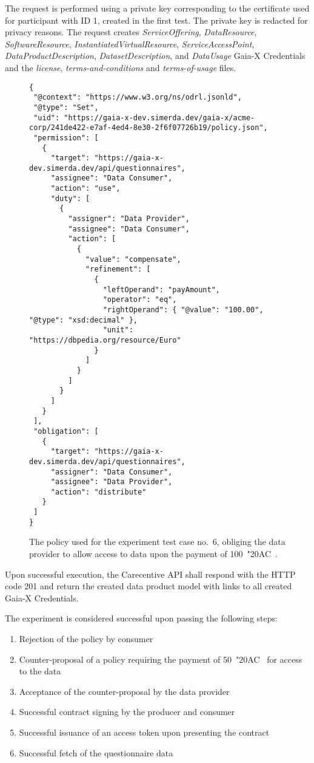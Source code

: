The request is performed using a private key corresponding to the certificate used for participant with ID 1, created in the first test.
The private key is redacted for privacy reasons.
The request creates \textit{ServiceOffering}, \textit{DataResource}, \textit{SoftwareResource}, \textit{InstantiatedVirtualResource}, \textit{ServiceAccessPoint}, \textit{DataProductDescription}, \textit{DatasetDescription}, and \textit{DataUsage} Gaia-X Credentials and the \textit{license}, \textit{terms-and-conditions} and \textit{terms-of-usage} files.

\begin{figure}[h]
    \centering
    \begin{verbatim}
{
 "@context": "https://www.w3.org/ns/odrl.jsonld",
 "@type": "Set",
 "uid": "https://gaia-x-dev.simerda.dev/gaia-x/acme-corp/241de422-e7af-4ed4-8e30-2f6f07726b19/policy.json",
 "permission": [
   {
     "target": "https://gaia-x-dev.simerda.dev/api/questionnaires",
     "assignee": "Data Consumer",
     "action": "use",
     "duty": [
       {
         "assigner": "Data Provider",
         "assignee": "Data Consumer",
         "action": [
           {
             "value": "compensate",
             "refinement": [
               {
                 "leftOperand": "payAmount",
                 "operator": "eq",
                 "rightOperand": { "@value": "100.00", "@type": "xsd:decimal" },
                 "unit": "https://dbpedia.org/resource/Euro"
               }
             ]
           }
         ]
       }
     ]
   }
 ],
 "obligation": [
   {
     "target": "https://gaia-x-dev.simerda.dev/api/questionnaires",
     "assigner": "Data Consumer",
     "assignee": "Data Provider",
     "action": "distribute"
   }
 ]
}
    \end{verbatim}
    \caption{The policy used for the experiment test case no.~6, obliging the data provider to allow access to data upon the payment of 100~\char"20AC~.}\label{fig:test_case_6_policy}
\end{figure}

Upon successful execution, the Carecentive API shall respond with the HTTP code 201 and return the created data product model with links to all created Gaia-X Credentials.

The experiment is considered successful upon passing the following steps:
\begin{enumerate}
    \item Rejection of the policy by consumer
    \item Counter-proposal of a policy requiring the payment of 50~\char"20AC~ for access to the data
    \item Acceptance of the counter-proposal by the data provider
    \item Successful contract signing by the producer and consumer
    \item Successful issuance of an access token upon presenting the contract
    \item Successful fetch of the questionnaire data
\end{enumerate}

